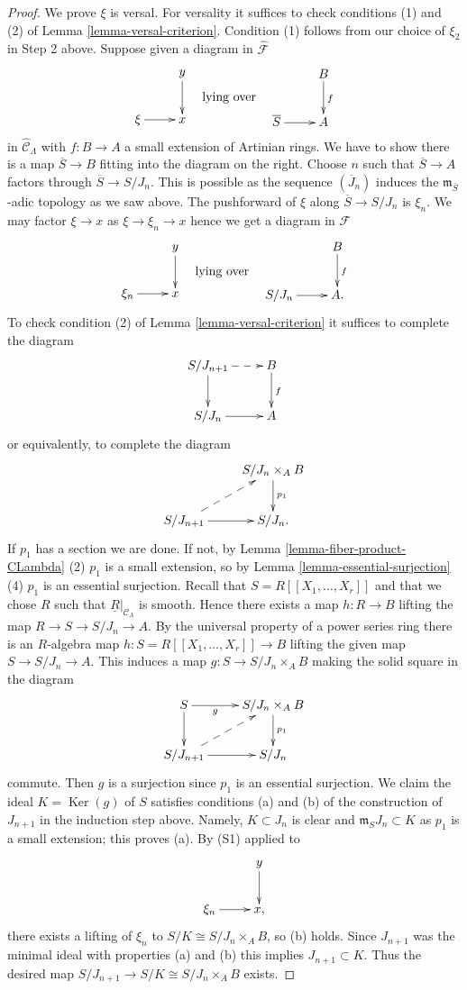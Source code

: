 \documentclass{stacks-project}
\theoremstyle{plain}
\theoremstyle{definition}
\theoremstyle{remark}
\numberwithin{equation}{subsection}
\def\Ker{\mathop{\mathrm{Ker}}}
\begin{document}
\begin{proof}
\medskip\noindent
We prove $\xi$ is versal. For versality it suffices to check
conditions (1) and (2) of
Lemma \ref{lemma-versal-criterion}.
Condition (1) follows from our choice of $\xi_2$ in Step 2 above.
Suppose given a diagram in $\widehat{\mathcal{F}}$
$$
\vcenter{
\xymatrix{
            &  y \ar[d] \\
\xi \ar[r]  &  x
}
}
\quad\text{lying over}\quad
\vcenter{
\xymatrix{
         &   B  \ar[d]^{f} \\
\overline{S} \ar[r] &   A
}
}
$$
in $\widehat{\mathcal{C}}_\Lambda$ with $f: B \to A$ a small extension
of Artinian rings. We have to show there is a map $\overline{S} \to B$ fitting
into the diagram on the right. Choose $n$ such that
$\overline{S} \to A$ factors through $\overline{S} \to S/J_n$. This is
possible as the sequence $(\overline{J}_n)$ induces the
$\mathfrak m_{\overline{S}}$-adic topology as we saw above.
The pushforward of $\xi$ along $\overline{S} \to S/J_n$ is $\xi_n$.
We may factor $\xi \to x$ as $\xi \to \xi_n \to x$ hence we get a diagram
in $\mathcal{F}$
$$
\vcenter{
\xymatrix{
            &  y \ar[d] \\
\xi_n \ar[r]  &  x
}
}
\quad\text{lying over}\quad
\vcenter{
\xymatrix{
         &   B  \ar[d]^{f} \\
S/J_n \ar[r] &   A .
}
}
$$
To check condition (2) of
Lemma \ref{lemma-versal-criterion}
it suffices to complete the diagram
$$
\xymatrix{
S/J_{n + 1} \ar[d] \ar@{-->}[r] & B \ar[d]^{f} \\
S/J_n   \ar[r] & A
}
$$
or equivalently, to complete the diagram
$$
\xymatrix{
  &  S/J_n \times_A B \ar[d]^{p_1} \\
S/J_{n + 1} \ar@{-->}[ur] \ar[r] &  S/J_n.
}
$$
If $p_1$ has a section we are done. If not, by
Lemma \ref{lemma-fiber-product-CLambda} (2)
$p_1$ is a small extension, so by
Lemma \ref{lemma-essential-surjection} (4)
$p_1$ is an essential surjection. Recall that $S = R[[X_1, \ldots, X_r]]$
and that we chose $R$ such that $\underline{R}|_{\mathcal{C}_\Lambda}$
is smooth. Hence there exists a map $h : R \to B$ lifting the map
$R \to S \to S/J_n \to A$. By the universal property of a power series
ring there is an $R$-algebra map $h : S = R[[X_1, \ldots, X_r]] \to B$
lifting the given map $S \to S/J_n \to A$. This induces a map
$g: S \to S/J_n \times_A B$ making the solid square in the diagram
$$
\xymatrix{
S \ar[d] \ar[r]_-g  &  S/J_n \times_A B \ar[d]^{p_1} \\
S/J_{n + 1} \ar@{-->}[ur] \ar[r] &  S/J_n
}
$$
commute. Then $g$ is a surjection since $p_1$ is an essential surjection.
We claim the ideal $K = \Ker(g)$ of $S$ satisfies conditions (a) and
(b) of the construction of $J_{n + 1}$ in the induction step above.
Namely, $K \subset J_n$ is clear and $\mathfrak m_SJ_n \subset K$ as $p_1$
is a small extension; this proves (a). By (S1) applied to
$$
\xymatrix{
            &  y \ar[d] \\
\xi_n \ar[r]  &  x,
}
$$
there exists a lifting of $\xi_n$ to $S/K \cong S/J_n \times_A B$, so (b)
holds. Since $J_{n + 1}$ was the minimal ideal with properties (a) and (b)
this implies $J_{n + 1} \subset K$. Thus the desired map
$S/J_{n+1} \to S/K \cong S/J_n \times_A B$ exists.
\end{proof}
\end{document}
